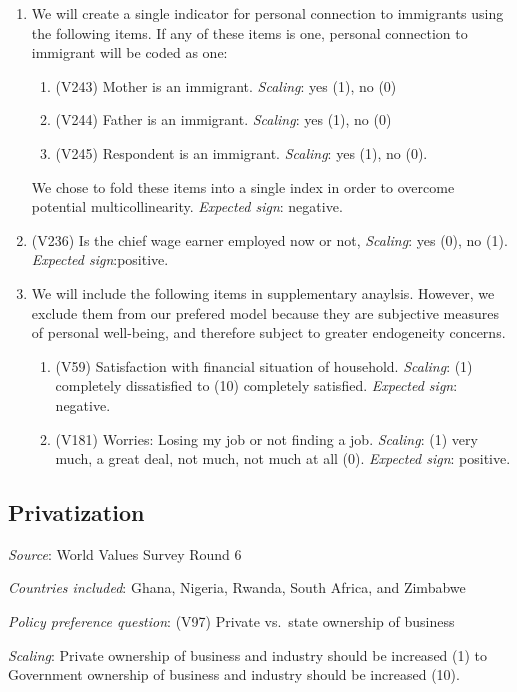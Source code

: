 \documentclass[]{article}
\begin{document}
\begin{enumerate}
  \item We will create a single indicator for personal connection to immigrants using the following items. If any of these items is one, personal connection to immigrant will be coded as one: 
  \begin{enumerate}
    \item (V243) Mother is an immigrant. \textit{Scaling}: yes (1), no (0)  
    \item (V244) Father is an immigrant. \textit{Scaling}: yes (1), no (0) 
    \item (V245) Respondent is an immigrant. \textit{Scaling}: yes (1), no (0). 
  \end{enumerate}
  We chose to fold these items into a single index in order to overcome potential multicollinearity. \textit{Expected sign}: negative. 
  \item (V236) Is the chief wage earner employed now or not, \textit{Scaling}: yes (0), no (1). \textit{Expected sign}:positive.
  \item We will include the following items in supplementary anaylsis. However, we exclude them from our prefered model because they are subjective measures of personal well-being, and therefore subject to greater endogeneity concerns. 
  \begin{enumerate}
    \item (V59) Satisfaction with financial situation of household. \textit{Scaling}: (1) completely dissatisfied to (10) completely satisfied. \textit{Expected sign}: negative.
    \item (V181) Worries: Losing my job or not finding a job. \textit{Scaling}: (1) very much, a great deal, not much, not much at all (0). \textit{Expected sign}: positive.
  \end{enumerate}
\end{enumerate}

\subsection{Privatization}\label{privatization}

\textit{Source}: World Values Survey Round 6

\textit{Countries included}: Ghana, Nigeria, Rwanda, South Africa, and
Zimbabwe

\textit{Policy preference question}: (V97) Private vs.~state ownership
of business

\textit{Scaling}: Private ownership of business and industry should be
increased (1) to Government ownership of business and industry should be
increased (10).
\end{document}
